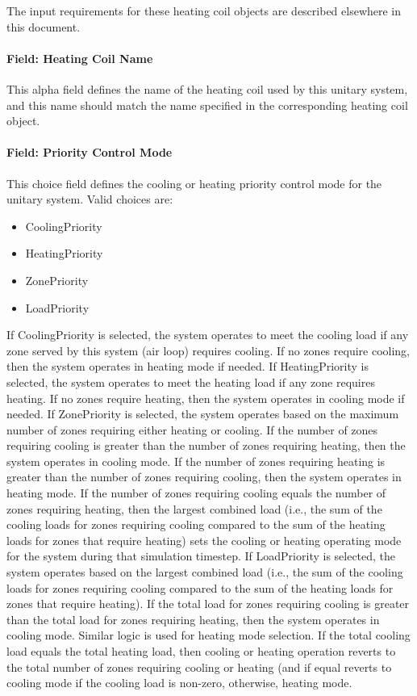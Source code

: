 The input requirements for these heating coil objects are described elsewhere in this document.

\paragraph{Field: Heating Coil Name}\label{field-heating-coil-name-8}

This alpha field defines the name of the heating coil used by this unitary system, and this name should match the name specified in the corresponding heating coil object.

\paragraph{Field: Priority Control Mode}\label{field-priority-control-mode}

This choice field defines the cooling or heating priority control mode for the unitary system. Valid choices are:

\begin{itemize}
\item
  CoolingPriority
\item
  HeatingPriority
\item
  ZonePriority
\item
  LoadPriority
\end{itemize}

If CoolingPriority is selected, the system operates to meet the cooling load if any zone served by this system (air loop) requires cooling. If no zones require cooling, then the system operates in heating mode if needed. If HeatingPriority is selected, the system operates to meet the heating load if any zone requires heating. If no zones require heating, then the system operates in cooling mode if needed. If ZonePriority is selected, the system operates based on the maximum number of zones requiring either heating or cooling. If the number of zones requiring cooling is greater than the number of zones requiring heating, then the system operates in cooling mode. If the number of zones requiring heating is greater than the number of zones requiring cooling, then the system operates in heating mode. If the number of zones requiring cooling equals the number of zones requiring heating, then the largest combined load (i.e., the sum of the cooling loads for zones requiring cooling compared to the sum of the heating loads for zones that require heating) sets the cooling or heating operating mode for the system during that simulation timestep. If LoadPriority is selected, the system operates based on the largest combined load (i.e., the sum of the cooling loads for zones requiring cooling compared to the sum of the heating loads for zones that require heating). If the total load for zones requiring cooling is greater than the total load for zones requiring heating, then the system operates in cooling mode. Similar logic is used for heating mode selection. If the total cooling load equals the total heating load, then cooling or heating operation reverts to the total number of zones requiring cooling or heating (and if equal reverts to cooling mode if the cooling load is non-zero, otherwise, heating mode.

